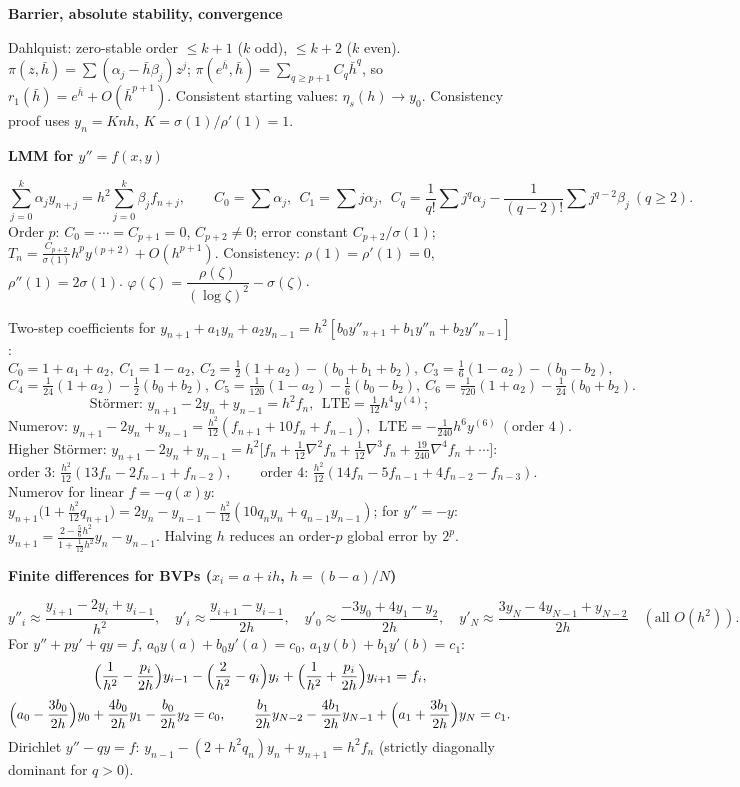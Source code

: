 \documentclass[10pt,a4paper]{article}
\newcommand{\hb}{\bar h}
\newcommand{\head}[1]{\par\smallskip\noindent\textbf{\color{blue!50!black}#1}\par\nobreak}
\begin{document}
\head{Barrier, absolute stability, convergence}
Dahlquist: zero-stable order \(\le k+1\) (\(k\) odd), \(\le k+2\) (\(k\) even).\;
\(\pi(z,\hb)=\sum(\alpha_j-\hb\beta_j)z^j\);\;
\(\pi(e^{\hb},\hb)=\sum_{q\ge p+1}C_q\hb^q\), so \(r_1(\hb)=e^{\hb}+O(\hb^{p+1})\).\;
Consistent starting values: \(\eta_s(h)\to y_0\).\;
Consistency proof uses \(y_n=Knh\), \(K=\sigma(1)/\rho'(1)=1\).

\head{LMM for \(y''=f(x,y)\)}
\[
  \sum_{j=0}^k\alpha_jy_{n+j}=h^2\sum_{j=0}^k\beta_jf_{n+j},
  \qquad
  C_0=\sum\alpha_j,\ \ C_1=\sum j\alpha_j,\ \
  C_q=\frac1{q!}\sum j^q\alpha_j-\frac1{(q-2)!}\sum j^{q-2}\beta_j\ (q\ge2).
\]
Order \(p\): \(C_0=\cdots=C_{p+1}=0\), \(C_{p+2}\ne0\);\;
error constant \(C_{p+2}/\sigma(1)\);\;
\(T_n=\frac{C_{p+2}}{\sigma(1)}h^py^{(p+2)}+O(h^{p+1})\).\;
Consistency: \(\rho(1)=\rho'(1)=0\), \(\rho''(1)=2\sigma(1)\).\;
\(\varphi(\zeta)=\dfrac{\rho(\zeta)}{(\log\zeta)^2}-\sigma(\zeta)\).

Two-step coefficients for \(y_{n+1}+a_1y_n+a_2y_{n-1}=h^2[b_0y''_{n+1}+b_1y''_n+b_2y''_{n-1}]\):
\[
  C_0=1+a_1+a_2,\ C_1=1-a_2,\ C_2=\tfrac12(1+a_2)-(b_0+b_1+b_2),\
  C_3=\tfrac16(1-a_2)-(b_0-b_2),
\]
\[
  C_4=\tfrac1{24}(1+a_2)-\tfrac12(b_0+b_2),\
  C_5=\tfrac1{120}(1-a_2)-\tfrac16(b_0-b_2),\
  C_6=\tfrac1{720}(1+a_2)-\tfrac1{24}(b_0+b_2).
\]
\[
  \text{St\"ormer: } y_{n+1}-2y_n+y_{n-1}=h^2f_n,\ \ \text{LTE}=\tfrac1{12}h^4y^{(4)};
\]
\[
  \text{Numerov: } y_{n+1}-2y_n+y_{n-1}=\tfrac{h^2}{12}(f_{n+1}+10f_n+f_{n-1}),\ \
  \text{LTE}=-\tfrac1{240}h^6y^{(6)}\ (\text{order }4).
\]
Higher St\"ormer: \(y_{n+1}-2y_n+y_{n-1}=h^2\bigl[f_n+\frac1{12}\nabla^2f_n+\frac1{12}\nabla^3f_n+\frac{19}{240}\nabla^4f_n+\cdots\bigr]\):
\[
  \text{order 3: } \tfrac{h^2}{12}(13f_n-2f_{n-1}+f_{n-2}),
  \qquad
  \text{order 4: } \tfrac{h^2}{12}(14f_n-5f_{n-1}+4f_{n-2}-f_{n-3}).
\]
Numerov for linear \(f=-q(x)y\):
\(y_{n+1}\bigl(1+\frac{h^2}{12}q_{n+1}\bigr)=2y_n-y_{n-1}-\frac{h^2}{12}(10q_ny_n+q_{n-1}y_{n-1})\);
for \(y''=-y\): \(y_{n+1}=\frac{2-\frac56h^2}{1+\frac1{12}h^2}y_n-y_{n-1}\).
Halving \(h\) reduces an order-\(p\) global error by \(2^p\).

\head{Finite differences for BVPs (\(x_i=a+ih\), \(h=(b-a)/N\))}
\[
  y''_i\approx\frac{y_{i+1}-2y_i+y_{i-1}}{h^2},\quad
  y'_i\approx\frac{y_{i+1}-y_{i-1}}{2h},\quad
  y'_0\approx\frac{-3y_0+4y_1-y_2}{2h},\quad
  y'_N\approx\frac{3y_N-4y_{N-1}+y_{N-2}}{2h}\quad(\text{all }O(h^2)).
\]
For \(y''+py'+qy=f\), \(a_0y(a)+b_0y'(a)=c_0\), \(a_1y(b)+b_1y'(b)=c_1\):
\[
  \Bigl(\frac1{h^2}-\frac{p_i}{2h}\Bigr)y_{i-1}-\Bigl(\frac2{h^2}-q_i\Bigr)y_i+\Bigl(\frac1{h^2}+\frac{p_i}{2h}\Bigr)y_{i+1}=f_i,
\]
\[
  \Bigl(a_0-\frac{3b_0}{2h}\Bigr)y_0+\frac{4b_0}{2h}y_1-\frac{b_0}{2h}y_2=c_0,
  \qquad
  \frac{b_1}{2h}y_{N-2}-\frac{4b_1}{2h}y_{N-1}+\Bigl(a_1+\frac{3b_1}{2h}\Bigr)y_N=c_1.
\]
Dirichlet \(y''-qy=f\): \(y_{n-1}-(2+h^2q_n)y_n+y_{n+1}=h^2f_n\) (strictly diagonally dominant for \(q>0\)).
\end{document}
